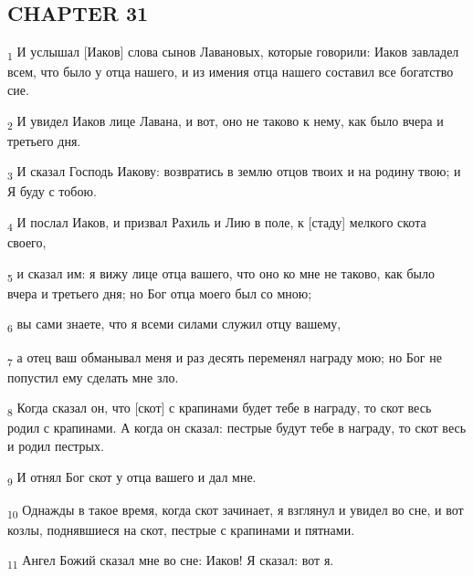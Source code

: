 \subsection{CHAPTER 31}
\begin{tcolorbox}
\textsubscript{1} И услышал [Иаков] слова сынов Лавановых, которые говорили: Иаков завладел всем, что было у отца нашего, и из имения отца нашего составил все богатство сие.
\end{tcolorbox}
\begin{tcolorbox}
\textsubscript{2} И увидел Иаков лице Лавана, и вот, оно не таково к нему, как было вчера и третьего дня.
\end{tcolorbox}
\begin{tcolorbox}
\textsubscript{3} И сказал Господь Иакову: возвратись в землю отцов твоих и на родину твою; и Я буду с тобою.
\end{tcolorbox}
\begin{tcolorbox}
\textsubscript{4} И послал Иаков, и призвал Рахиль и Лию в поле, к [стаду] мелкого скота своего,
\end{tcolorbox}
\begin{tcolorbox}
\textsubscript{5} и сказал им: я вижу лице отца вашего, что оно ко мне не таково, как было вчера и третьего дня; но Бог отца моего был со мною;
\end{tcolorbox}
\begin{tcolorbox}
\textsubscript{6} вы сами знаете, что я всеми силами служил отцу вашему,
\end{tcolorbox}
\begin{tcolorbox}
\textsubscript{7} а отец ваш обманывал меня и раз десять переменял награду мою; но Бог не попустил ему сделать мне зло.
\end{tcolorbox}
\begin{tcolorbox}
\textsubscript{8} Когда сказал он, что [скот] с крапинами будет тебе в награду, то скот весь родил с крапинами. А когда он сказал: пестрые будут тебе в награду, то скот весь и родил пестрых.
\end{tcolorbox}
\begin{tcolorbox}
\textsubscript{9} И отнял Бог скот у отца вашего и дал мне.
\end{tcolorbox}
\begin{tcolorbox}
\textsubscript{10} Однажды в такое время, когда скот зачинает, я взглянул и увидел во сне, и вот козлы, поднявшиеся на скот, пестрые с крапинами и пятнами.
\end{tcolorbox}
\begin{tcolorbox}
\textsubscript{11} Ангел Божий сказал мне во сне: Иаков! Я сказал: вот я.
\end{tcolorbox}
